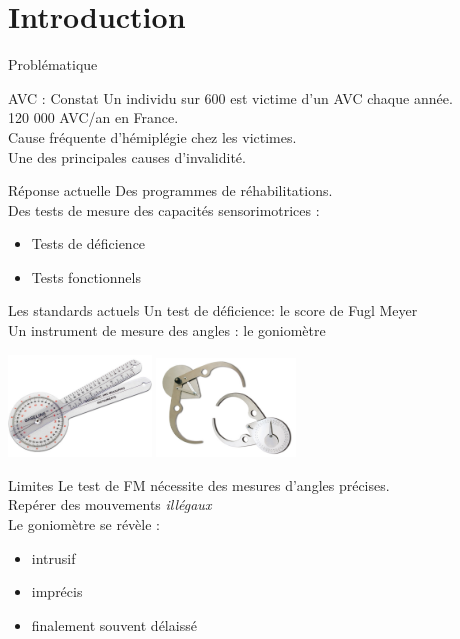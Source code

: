 \section{Introduction}

\begin{frame}
\end{frame}

\begin{frame}{Problématique}
	\begin{alertblock}{AVC : Constat}
		Un individu sur 600 est victime d'un AVC chaque année. \\
		120 000 AVC/an en France. \\ \pause 
		Cause fréquente d'hémiplégie chez les victimes. \\
		Une des principales causes d'invalidité.
	\end{alertblock}
\end{frame}

\begin{frame}
	\begin{block}{Réponse actuelle}
	Des programmes de réhabilitations.\\
	Des tests de mesure des capacités sensorimotrices :
		\begin{itemize}
			\item Tests de déficience
			\item Tests fonctionnels
		\end{itemize}
	\end{block}

\begin{block}{Les standards actuels}
Un test de déficience: le score de Fugl Meyer \\
Un instrument de mesure des angles : le goniomètre
\end{block}
\begin{center}
\includegraphics[width=3.8cm]{../images/goniometre.jpg}
\includegraphics[width=3.7cm]{../images/clockprop.jpg}
\end{center}
\end{frame}

\begin{frame}
\begin{block}{Limites}
Le test de FM nécessite des mesures d'angles précises.\\
Repérer des mouvements \textit{illégaux} \\ \pause
Le goniomètre se révèle :
\begin{itemize}
	\item intrusif
	\item imprécis
	\item finalement souvent délaissé
\end{itemize}
\end{block}
\end{frame}
